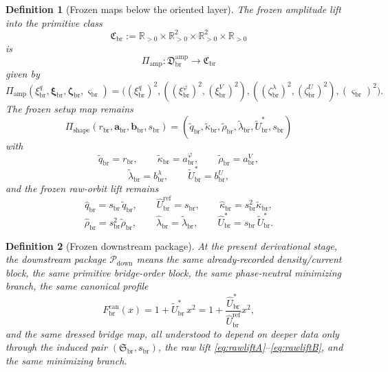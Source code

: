 \documentclass[11pt]{article}
\newcommand{\RespShapeReadout}{\widetilde q_{\mathrm{br}}}
\newcommand{\RespShapeCov}{\widetilde\kappa_{\mathrm{br}}}
\newcommand{\RespShapeRelax}{\widetilde\rho_{\mathrm{br}}}
\newcommand{\RespShapeWell}{\widetilde\lambda_{\mathrm{br}}}
\newcommand{\RespShapeEq}{\widetilde U_{\mathrm{br}}^{\ast}}
\newcommand{\RespRawReadout}{\widehat q_{\mathrm{br}}}
\newcommand{\RespRawRef}{\widehat U_{\mathrm{br}}^{\mathrm{ref}}}
\newcommand{\RespRawCov}{\widehat\kappa_{\mathrm{br}}}
\newcommand{\RespRawRelax}{\widehat\rho_{\mathrm{br}}}
\newcommand{\RespRawWell}{\widehat\lambda_{\mathrm{br}}}
\newcommand{\RespRawEq}{\widehat U_{\mathrm{br}}^{\ast}}
\newcommand{\CurvProfileCan}{F_{\mathrm{br}}^{\mathrm{can}}}
\newcommand{\DownPkg}{\mathscr P_{\mathrm{down}}}
\newcommand{\ShapeTuple}{\mathfrak S_{\mathrm{br}}}
\newcommand{\ScaleMod}{s_{\mathrm{br}}}
\newcommand{\PrimClass}{\mathfrak C_{\mathrm{br}}}
\newcommand{\PrimRead}{r_{\mathrm{br}}}
\newcommand{\PrimCovSlot}{a_{\mathrm{br}}^{\varphi}}
\newcommand{\PrimRelaxSlot}{a_{\mathrm{br}}^{V}}
\newcommand{\PrimKinetic}{\bm a_{\mathrm{br}}}
\newcommand{\PrimWellSlot}{b_{\mathrm{br}}^{\lambda}}
\newcommand{\PrimEqSlot}{b_{\mathrm{br}}^{U}}
\newcommand{\PrimAnchor}{\bm b_{\mathrm{br}}}
\newcommand{\LiftSector}{\mathfrak D_{\mathrm{br}}^{\mathrm{amp}}}
\newcommand{\DeepReadAmp}{\xi_{\mathrm{br}}^{q}}
\newcommand{\DeepCovAmp}{\xi_{\mathrm{br}}^{\varphi}}
\newcommand{\DeepRelaxAmp}{\xi_{\mathrm{br}}^{V}}
\newcommand{\DeepKinAmp}{\bm\xi_{\mathrm{br}}}
\newcommand{\DeepWellAmp}{\zeta_{\mathrm{br}}^{\lambda}}
\newcommand{\DeepEqAmp}{\zeta_{\mathrm{br}}^{U}}
\newcommand{\DeepAnchorAmp}{\bm\zeta_{\mathrm{br}}}
\newcommand{\DeepScaleAmp}{\varsigma_{\mathrm{br}}}
\newcommand{\AmpMap}{\Pi_{\mathrm{amp}}}
\newcommand{\PrimMap}{\Pi_{\mathrm{shape}}}
\newtheorem{definition}{Definition}
\begin{document}
\begin{definition}[Frozen maps below the oriented layer]
\label{def:frozenmaps}
The frozen amplitude lift into the primitive class
\begin{equation}
\PrimClass
:=
\mathbb R_{>0}\times\mathbb R_{>0}^{2}\times\mathbb R_{>0}^{2}\times\mathbb R_{>0}
\label{eq:primclass}
\end{equation}
is
\begin{equation}
\AmpMap:\LiftSector\longrightarrow\PrimClass
\label{eq:ampmap}
\end{equation}
given by
\begin{equation}
\AmpMap(\DeepReadAmp,\DeepKinAmp,\DeepAnchorAmp,\DeepScaleAmp)
=
\bigl(
(\DeepReadAmp)^{2},
((\DeepCovAmp)^{2},(\DeepRelaxAmp)^{2}),
((\DeepWellAmp)^{2},(\DeepEqAmp)^{2}),
(\DeepScaleAmp)^{2}
\bigr).
\label{eq:ampmapexplicit}
\end{equation}
The frozen setup map remains
\begin{equation}
\PrimMap(\PrimRead,\PrimKinetic,\PrimAnchor,\ScaleMod)
=
(\RespShapeReadout,\RespShapeCov,\RespShapeRelax,\RespShapeWell,\RespShapeEq,\ScaleMod)
\label{eq:primmap}
\end{equation}
with
\begin{equation}
\RespShapeReadout=\PrimRead,
\qquad
\RespShapeCov=\PrimCovSlot,
\qquad
\RespShapeRelax=\PrimRelaxSlot,
\label{eq:shapeA}
\end{equation}
\begin{equation}
\RespShapeWell=\PrimWellSlot,
\qquad
\RespShapeEq=\PrimEqSlot,
\label{eq:shapeB}
\end{equation}
and the frozen raw-orbit lift remains
\begin{equation}
\RespRawReadout=\ScaleMod\,\RespShapeReadout,
\qquad
\RespRawRef=\ScaleMod,
\qquad
\RespRawCov=\ScaleMod^{2}\RespShapeCov,
\label{eq:rawliftA}
\end{equation}
\begin{equation}
\RespRawRelax=\ScaleMod^{2}\RespShapeRelax,
\qquad
\RespRawWell=\RespShapeWell,
\qquad
\RespRawEq=\ScaleMod\,\RespShapeEq.
\label{eq:rawliftB}
\end{equation}
\end{definition}

\begin{definition}[Frozen downstream package]
\label{def:frozendown}
At the present derivational stage, the downstream package \(\DownPkg\) means the same already-recorded density/current block, the same primitive bridge-order block, the same phase-neutral minimizing branch, the same canonical profile
\begin{equation}
\CurvProfileCan(x)=1+\RespShapeEq\,x^2
=
1+\frac{\RespRawEq}{\RespRawRef}x^2,
\label{eq:profile}
\end{equation}
and the same dressed bridge map, all understood to depend on deeper data only through the induced pair \((\ShapeTuple,\ScaleMod)\), the raw lift \eqref{eq:rawliftA}--\eqref{eq:rawliftB}, and the same minimizing branch.
\end{definition}
\end{document}
